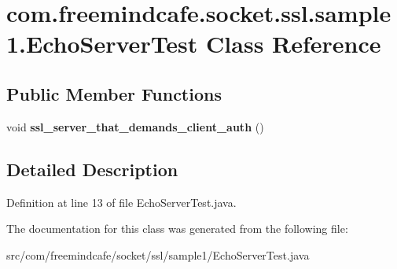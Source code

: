 \hypertarget{classcom_1_1freemindcafe_1_1socket_1_1ssl_1_1sample1_1_1_echo_server_test}{}\section{com.\+freemindcafe.\+socket.\+ssl.\+sample1.\+Echo\+Server\+Test Class Reference}
\label{classcom_1_1freemindcafe_1_1socket_1_1ssl_1_1sample1_1_1_echo_server_test}
\subsection*{Public Member Functions}
\begin{DoxyCompactItemize}
\item 
\hypertarget{classcom_1_1freemindcafe_1_1socket_1_1ssl_1_1sample1_1_1_echo_server_test_a7b2bf9ab674d47322fc10140179bb11e}{}void {\bfseries ssl\+\_\+server\+\_\+that\+\_\+demands\+\_\+client\+\_\+auth} ()\label{classcom_1_1freemindcafe_1_1socket_1_1ssl_1_1sample1_1_1_echo_server_test_a7b2bf9ab674d47322fc10140179bb11e}

\end{DoxyCompactItemize}


\subsection{Detailed Description}


Definition at line 13 of file Echo\+Server\+Test.\+java.



The documentation for this class was generated from the following file\+:\begin{DoxyCompactItemize}
\item 
src/com/freemindcafe/socket/ssl/sample1/Echo\+Server\+Test.\+java\end{DoxyCompactItemize}
